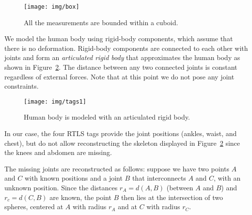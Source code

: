 \begin{figure}[!h]
\centering
\texttt{[image: img/box]}
\caption{All the measurements are bounded within a cuboid.}
\label{fig:cuboid}
\end{figure}


We model the human body using rigid-body components, which assume that there is no deformation.   Rigid-body components are connected to each other with joints and form an \textit{articulated rigid body} that approximates the human body as shown in Figure~\ref{fig:tags:noise}. The distance between any two connected joints is constant regardless of external forces. Note that at this point we do not pose any joint constraints.

\begin{figure}[!h]
\centering
\texttt{[image: img/tags1]}
\caption{Human body is modeled with an articulated rigid body.}
\label{fig:tags:noise}
\end{figure}

In our case, the four RTLS tags provide the joint positions (ankles, waist, and chest), but do not allow reconstructing the skeleton displayed in Figure~\ref{fig:tags:noise} since the knees and abdomen are missing. 

The missing joints are reconstructed as follows: suppose we have two points $A$ and $C$ with known positions and a joint $B$ that interconnects $A$ and $C$, with an unknown position. Since the distances $r_A=d(A, B)$ (between $A$ and $B$) and $r_c=d(C, B)$ are known, the point $B$ then lies at the intersection of two spheres, centered at $A$ with radius $r_A$ and at $C$ with radius $r_C$. 

